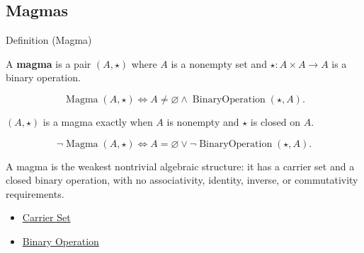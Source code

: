 \subsection*{Magmas}
\label{subsec:magmas}

\begin{definitionbox}{Definition (Magma)}
\begin{definition}[Magma]
\label{def:magma}
A \textbf{magma} is a pair $(A,\star)$ where $A$ is a nonempty set and
$\star:A\times A\to A$ is a binary operation.
\end{definition}
\end{definitionbox}

\begin{remark*}
\[
\operatorname{Magma}(A,\star)
\Longleftrightarrow
A\neq\varnothing
\land
\operatorname{BinaryOperation}(\star,A).
\]
\end{remark*}

\begin{remark*}
$(A,\star)$ is a magma exactly when $A$ is nonempty and $\star$ is closed on
$A$.
\end{remark*}

\begin{remark*}
\[
\neg\operatorname{Magma}(A,\star)
\Longleftrightarrow
A=\varnothing
\lor
\neg\operatorname{BinaryOperation}(\star,A).
\]
\end{remark*}

\begin{remark*}[Interpretation]
A magma is the weakest nontrivial algebraic structure: it has a carrier set and
a closed binary operation, with no associativity, identity, inverse, or
commutativity requirements.
\end{remark*}

\begin{dependencies}
\begin{itemize}
  \item \hyperref[def:carrier-set]{Carrier Set}
  \item \hyperref[def:binary-operation]{Binary Operation}
\end{itemize}
\end{dependencies}
